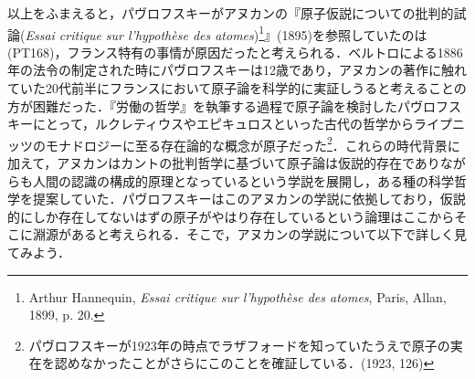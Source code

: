 以上をふまえると，パヴロフスキーがアヌカンの『原子仮説についての批判的試論(\emph{Essai critique sur l'hypothèse des atomes})\footnote{Arthur Hannequin, \emph{Essai critique sur l'hypothèse des atomes}, Paris, Allan, 1899, p. 20.}』(1895)を参照していたのは(PT168)，フランス特有の事情が原因だったと考えられる．ベルトロによる1886年の法令の制定された時にパヴロフスキーは12歳であり，アヌカンの著作に触れていた20代前半にフランスにおいて原子論を科学的に実証しうると考えることの方が困難だった．『労働の哲学』を執筆する過程で原子論を検討したパヴロフスキーにとって，ルクレティウスやエピキュロスといった古代の哲学からライプニッツのモナドロジーに至る存在論的な概念が原子だった\footnote{パヴロフスキーが1923年の時点でラザフォードを知っていたうえで原子の実在を認めなかったことがさらにこのことを確証している．(1923, 126)}．これらの時代背景に加えて，アヌカンはカントの批判哲学に基づいて原子論は仮説的存在でありながらも人間の認識の構成的原理となっているという学説を展開し，ある種の科学哲学を提案していた．パヴロフスキーはこのアヌカンの学説に依拠しており，仮説的にしか存在してないはずの原子がやはり存在しているという論理はここからそこに淵源があると考えられる．そこで，アヌカンの学説について以下で詳しく見てみよう．

